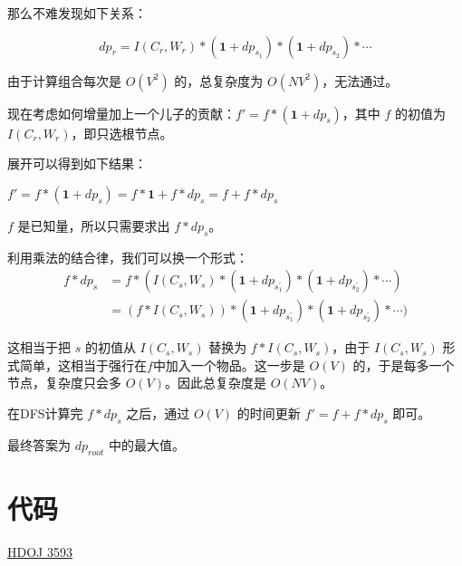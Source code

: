 \documentclass{article}
\begin{document}
那么不难发现如下关系：

$$
dp_r = I(C_r,W_r) * (\textbf{1}+dp_{s_1})* (\textbf{1}+dp_{s_2}) * \cdots
$$

由于计算组合每次是 $O(V^2)$ 的，总复杂度为 $O(NV^2)$，无法通过。

现在考虑如何增量加上一个儿子的贡献：$f' = f * (\textbf{1}+dp_s)$，其中 $f$ 的初值为 $I(C_r,W_r)$，即只选根节点。

展开可以得到如下结果：
\begin{center}
    $f' = f * (\textbf{1}+dp_s) = f*\textbf{1} + f*dp_s = f + f*dp_s$
\end{center}

$f$ 是已知量，所以只需要求出 $f*dp_s$。

利用乘法的结合律，我们可以换一个形式：
\begin{align*}
    f*dp_s
    &= f * (I(C_s,W_s) * (\textbf{1}+dp_{s_{1}^{\prime}})* (\textbf{1}+dp_{s_2^{\prime}}) * \cdots)\\
    &= (f * I(C_s,W_s)) * (\textbf{1}+dp_{s_{1}^{\prime}})* (\textbf{1}+dp_{s_2^{\prime}}) * \cdots)
\end{align*}

这相当于把 $s$ 的初值从 $I(C_s,W_s)$ 替换为 $f * I(C_s,W_s)$，由于 $I(C_s,W_s)$ 形式简单，这相当于强行在$f$中加入一个物品。这一步是 $O(V)$ 的，于是每多一个节点，复杂度只会多 $O(V)$。因此总复杂度是 $O(NV)$。

在DFS计算完 $f*dp_s$ 之后，通过 $O(V)$ 的时间更新 $f' = f+f*dp_s$ 即可。

最终答案为 $dp_{root}$ 中的最大值。

\section{代码}
\href{https://gist.github.com/SamZhangQingChuan/7c15974f308a45d6fcb114d029b4eda8}{HDOJ 3593}
\end{document}
